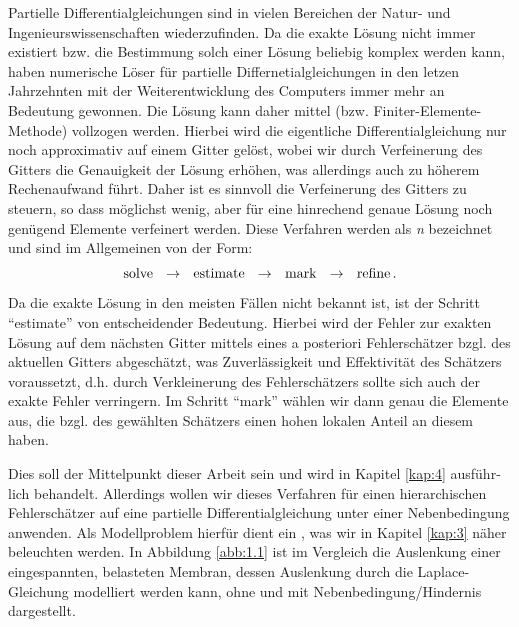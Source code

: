 \label{kap:1}


Partielle Differentialgleichungen sind in vielen Bereichen der Natur- und Ingenieurswissenschaften wiederzufinden. Da die exakte Lösung nicht immer existiert bzw. die Bestimmung solch einer Lösung beliebig komplex werden kann, haben numerische Löser für partielle Differnetialgleichungen in den letzen Jahrzehnten mit der Weiterentwicklung des Computers immer mehr an Bedeutung gewonnen. Die Lösung kann daher mittel  (bzw. Finiter-Elemente-Methode) vollzogen werden. Hierbei wird die eigentliche Differentialgleichung nur noch approximativ auf einem Gitter gelöst, wobei wir durch Verfeinerung des Gitters die Genauigkeit der Lösung erhöhen, was allerdings auch zu höherem Rechenaufwand führt. Daher ist es sinnvoll die Verfeinerung des Gitters zu steuern, so dass möglichst wenig, aber für eine hinrechend genaue Lösung noch genügend Elemente verfeinert werden. Diese Verfahren werden als \textit{n} bezeichnet und sind im Allgemeinen von der Form:
\[
	\text{solve}\ \ \ra \ \ \text{estimate}\ \ \ra\ \ \text{mark}\ \ \ra\  \ \text{refine} \, .
\]
Da die exakte Lösung in den meisten Fällen nicht bekannt ist, ist der Schritt "`estimate"' von entscheidender Bedeutung. Hierbei wird der Fehler zur exakten Lösung auf dem nächsten Gitter mittels eines a posteriori Fehlerschätzer bzgl. des aktuellen Gitters abgeschätzt, was Zuverlässigkeit und Effektivität des Schätzers voraussetzt, d.h. durch Verkleinerung des Fehlerschätzers sollte sich auch der exakte Fehler verringern. Im Schritt "`mark"' wählen wir dann genau die Elemente aus, die bzgl. des gewählten Schätzers einen hohen lokalen Anteil an diesem haben.

Dies soll der Mittelpunkt dieser Arbeit sein und wird in Kapitel \ref{kap:4} ausführ-lich behandelt. Allerdings wollen wir dieses Verfahren für einen hierarchischen Fehlerschätzer auf eine partielle Differentialgleichung unter einer Nebenbedingung anwenden. Als Modellproblem hierfür dient ein , was wir in Kapitel \ref{kap:3} näher beleuchten werden. In Abbildung \ref{abb:1.1} ist im Vergleich die Auslenkung einer eingespannten, belasteten Membran, dessen Auslenkung durch die Laplace-Gleichung modelliert werden kann, ohne und mit Nebenbedingung/Hindernis dargestellt.


